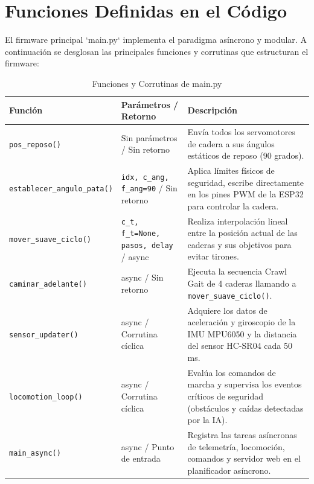 \documentclass[12pt]{article}
\newcommand{\codigo}[1]{\texttt{#1}}
\begin{document}
\section{Funciones Definidas en el Código}
El firmware principal `main.py` implementa el paradigma asíncrono y modular. A continuación se desglosan las principales funciones y corrutinas que estructuran el firmware:

\begin{table}[htbp]
\centering
\caption{Funciones y Corrutinas de main.py}
\vspace{0.3cm}
\begin{tabularx}{\textwidth}{l >{\raggedright\arraybackslash}p{4.5cm} >{\raggedright\arraybackslash}X}
\toprule
\textbf{Función} & \textbf{Parámetros / Retorno} & \textbf{Descripción} \\
\midrule
\codigo{pos\_reposo()} & Sin parámetros / Sin retorno & Envía todos los servomotores de cadera a sus ángulos estáticos de reposo (90 grados). \\
\codigo{establecer\_angulo\_pata()} & \codigo{idx, c\_ang, f\_ang=90} / Sin retorno & Aplica límites físicos de seguridad, escribe directamente en los pines PWM de la ESP32 para controlar la cadera. \\
\codigo{mover\_suave\_ciclo()} & \codigo{c\_t, f\_t=None, pasos, delay} / async & Realiza interpolación lineal entre la posición actual de las caderas y sus objetivos para evitar tirones. \\
\codigo{caminar\_adelante()} & async / Sin retorno & Ejecuta la secuencia Crawl Gait de 4 caderas llamando a \codigo{mover\_suave\_ciclo()}. \\
\codigo{sensor\_updater()} & async / Corrutina cíclica & Adquiere los datos de aceleración y giroscopio de la IMU MPU6050 y la distancia del sensor HC-SR04 cada 50 ms. \\
\codigo{locomotion\_loop()} & async / Corrutina cíclica & Evalúa los comandos de marcha y supervisa los eventos críticos de seguridad (obstáculos y caídas detectadas por la IA). \\
\codigo{main\_async()} & async / Punto de entrada & Registra las tareas asíncronas de telemetría, locomoción, comandos y servidor web en el planificador asíncrono. \\
\bottomrule
\end{tabularx}
\end{table}

\newpage

\end{document}
